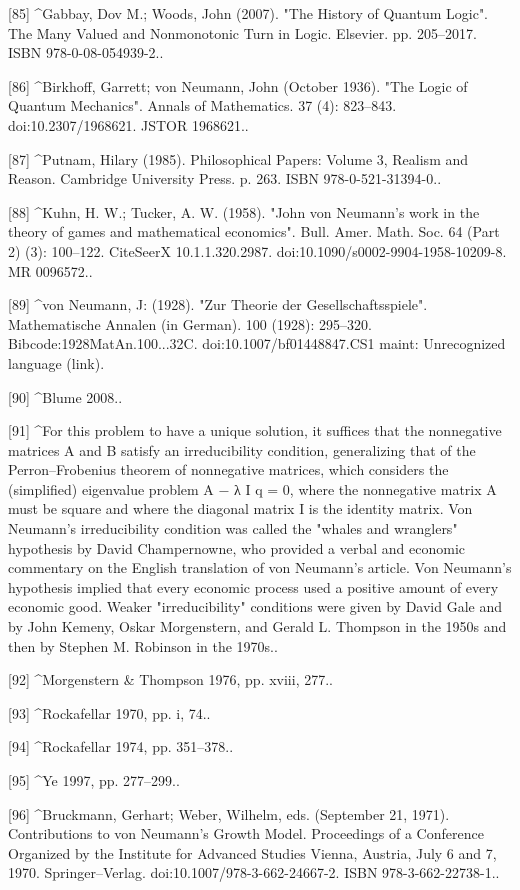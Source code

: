 [85]
^Gabbay, Dov M.; Woods, John (2007). "The History of Quantum Logic". The Many Valued and Nonmonotonic Turn in Logic. Elsevier. pp. 205–2017. ISBN 978-0-08-054939-2..

[86]
^Birkhoff, Garrett; von Neumann, John (October 1936). "The Logic of Quantum Mechanics". Annals of Mathematics. 37 (4): 823–843. doi:10.2307/1968621. JSTOR 1968621..

[87]
^Putnam, Hilary (1985). Philosophical Papers: Volume 3, Realism and Reason. Cambridge University Press. p. 263. ISBN 978-0-521-31394-0..

[88]
^Kuhn, H. W.; Tucker, A. W. (1958). "John von Neumann's work in the theory of games and mathematical economics". Bull. Amer. Math. Soc. 64 (Part 2) (3): 100–122. CiteSeerX 10.1.1.320.2987. doi:10.1090/s0002-9904-1958-10209-8. MR 0096572..

[89]
^von Neumann, J: (1928). "Zur Theorie der Gesellschaftsspiele". Mathematische Annalen (in German). 100 (1928): 295–320. Bibcode:1928MatAn.100...32C. doi:10.1007/bf01448847.CS1 maint: Unrecognized language (link).

[90]
^Blume 2008..

[91]
^For this problem to have a unique solution, it suffices that the nonnegative matrices A and B satisfy an irreducibility condition, generalizing that of the Perron–Frobenius theorem of nonnegative matrices, which considers the (simplified) eigenvalue problem A − λ I q = 0, where the nonnegative matrix A must be square and where the diagonal matrix I is the identity matrix. Von Neumann's irreducibility condition was called the "whales and wranglers" hypothesis by David Champernowne, who provided a verbal and economic commentary on the English translation of von Neumann's article. Von Neumann's hypothesis implied that every economic process used a positive amount of every economic good. Weaker "irreducibility" conditions were given by David Gale and by John Kemeny, Oskar Morgenstern, and Gerald L. Thompson in the 1950s and then by Stephen M. Robinson in the 1970s..

[92]
^Morgenstern & Thompson 1976, pp. xviii, 277..

[93]
^Rockafellar 1970, pp. i, 74..

[94]
^Rockafellar 1974, pp. 351–378..

[95]
^Ye 1997, pp. 277–299..

[96]
^Bruckmann, Gerhart; Weber, Wilhelm, eds. (September 21, 1971). Contributions to von Neumann's Growth Model. Proceedings of a Conference Organized by the Institute for Advanced Studies Vienna, Austria, July 6 and 7, 1970. Springer–Verlag. doi:10.1007/978-3-662-24667-2. ISBN 978-3-662-22738-1..

